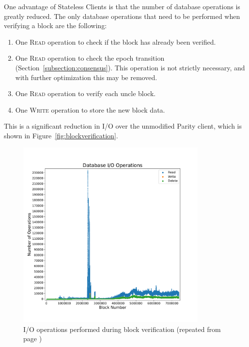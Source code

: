 \documentclass[12pt]{article}
\newcommand{\System}{Stateless Clients\xspace}
\newcommand{\figurewidth}{0.85\textwidth}
\newcommand{\repeatcaption}[2]{%
  \renewcommand{\thefigure}{\ref{#1}}%
  \captionsetup{list=no}%
  \caption{#2 (repeated from page \pageref{#1})}%
}
\begin{document}
One advantage of \System is that the number of database operations is greatly reduced. The only database operations that need to be performed when verifying a block are the following:
\begin{enumerate}
  \item One \textsc{Read} operation to check if the block has already been verified.
  \item One \textsc{Read} operation to check the epoch transition (Section~\ref{subsection:consensus}). This operation is not strictly necessary, and with further optimization this may be removed.
  \item One \textsc{Read} operation to verify each uncle block.
  \item One \textsc{Write} operation to store the new block data.
\end{enumerate}

This is a significant reduction in I/O over the unmodified Parity client, which is shown in Figure~\ref{fig:blockverification}.

\begin{figure}[H]
  \centering
  \includegraphics[width=\figurewidth]{../figures/results/graphs/background/db-io-ops.pdf}
  \repeatcaption{fig:blockverification}{I/O operations performed during block verification}
\end{figure}
\end{document}
